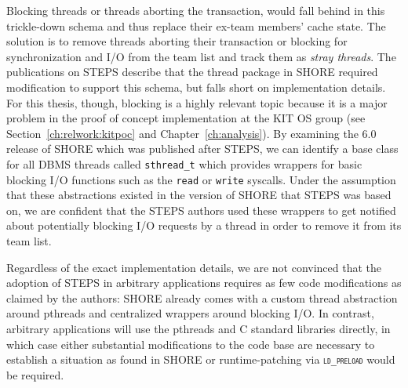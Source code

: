 \documentclass[12pt,a4paper]{book}
\begin{document}
Blocking threads or threads aborting the transaction, would fall behind in this trickle-down schema and thus replace their ex-team members' cache state.
The solution is to remove threads aborting their transaction or blocking for synchronization and I/O from the team list and track them as \emph{stray threads}.
The publications on STEPS describe that the thread package in SHORE required modification to support this schema, but falls short on implementation details.
For this thesis, though, blocking is a highly relevant topic because it is a major problem in the proof of concept implementation at the KIT OS group (see Section~\ref{ch:relwork:kitpoc} and Chapter~\ref{ch:analysis}).
By examining the 6.0 release of SHORE which was published after STEPS, we can identify a base class for all DBMS threads called \texttt{sthread\_t} which provides wrappers for basic blocking I/O functions such as the \texttt{read} or \texttt{write} syscalls.
Under the assumption that these abstractions existed in the version of SHORE that STEPS was based on, we are confident that the STEPS authors used these wrappers to get notified about potentially blocking I/O requests by a thread in order to remove it from its team list.~\cite{shoreRelease,shore}

Regardless of the exact implementation details, we are not convinced that the adoption of STEPS in arbitrary applications requires as few code modifications as claimed by the authors:
SHORE already comes with a custom thread abstraction around pthreads and centralized wrappers around blocking I/O.
In contrast, arbitrary applications will use the pthreads and C standard libraries directly, in which case
either substantial modifications to the code base are necessary to establish a situation as found in SHORE
or runtime-patching via \textsc{\texttt{ld\_preload}} would be required.
\end{document}
